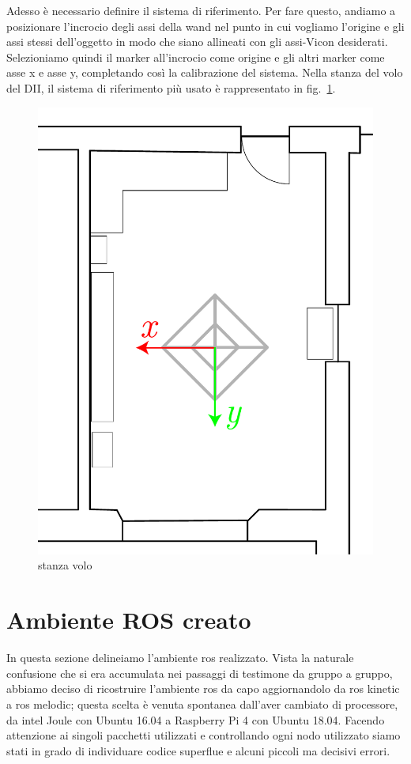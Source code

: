 Adesso è necessario definire il sistema di riferimento. Per fare questo, andiamo a posizionare l'incrocio degli assi della wand nel punto in cui vogliamo 
l'origine e gli assi stessi dell'oggetto in modo che siano allineati con gli assi-Vicon desiderati.
Selezioniamo quindi il marker all'incrocio come origine e gli altri marker come asse x e asse y, completando così la calibrazione del sistema. 
Nella stanza del volo del DII, il sistema di riferimento più usato è rappresentato in fig.~\ref{fig: stanza volo Vicon frame}.

\begin{figure}[] 
	\centering    
	\includegraphics[height=.4\textheight]{stanza_volo.pdf}
	\caption{stanza volo}
	\label{fig: stanza volo Vicon frame}
\end{figure}


\newpage
\section{Ambiente ROS creato}
\label{sez:Ambiente ROS creato}
In questa sezione delineiamo l'ambiente ros realizzato. 
Vista la naturale confusione che si era accumulata nei passaggi di testimone da gruppo a gruppo, abbiamo deciso di ricostruire l'ambiente ros da capo aggiornandolo da ros kinetic a ros melodic; questa scelta \`e venuta spontanea dall'aver cambiato di processore, da intel Joule con Ubuntu 16.04 a Raspberry Pi 4 con Ubuntu 18.04.
Facendo attenzione ai singoli pacchetti utilizzati e controllando ogni nodo utilizzato siamo stati in grado di individuare codice superflue e alcuni piccoli ma decisivi errori.

